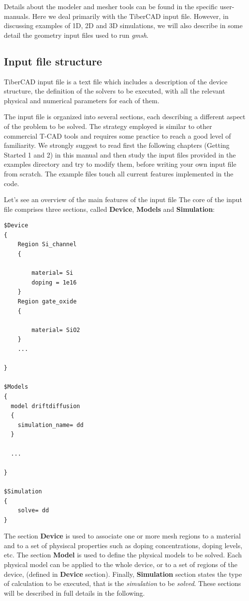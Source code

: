 Details about the modeler and mesher tools can be found in the specific user-manuals. Here we deal primarily with the TiberCAD{}   input file. However, in discussing examples of 1D, 2D and 3D simulations, we will also describe in some detail the geometry input files used to run {\em gmsh}.  
\subsection{ Input file  structure}
 TiberCAD{}   input file is  a  text file  which  includes  a  description of  the  device  structure,  the  definition of  the  solvers  to  be  executed,  with  all  the  relevant  physical and  numerical  parameters for  each  of  them.


The input file is organized into several sections, each describing a different aspect of the problem to be solved. The strategy employed is similar to other commercial T-CAD tools and requires some practice to reach a good level of familiarity. We strongly suggest to read first the following chapters (Getting  Started  1 and  2)  in this manual and then study the input files provided in the examples directory and try to  modify them, before writing your own  input file from scratch. The example files touch all current features implemented in the code.

Let's see  an  overview  of  the  main  features of the  input file 
The core of  the input file comprises three sections, called \textbf{Device}, \textbf{Models} and \textbf{Simulation}:

\begin{verbatim}
$Device
{
	Region Si_channel
	{
		
		material= Si	
		doping = 1e16
	}
	Region gate_oxide
	{
		
		material= SiO2
	}
	...
	
}

$Models
{
  model driftdiffusion
  {
    simulation_name= dd
  }
  
  ...
  
}

$Simulation
{
	solve= dd
}
\end{verbatim}

The section \textbf{Device} is used to associate one or more mesh regions to a material and to a set of   physiscal properties such as doping concentrations, doping levels, etc.
 The section
\textbf{Model} is used to define the physical models to be solved. Each physical model can be applied to the whole  device, or to a set of regions of  the  device,  (defined in \textbf{Device}   section). 
Finally, \textbf{Simulation}  section states the type of calculation to  be  executed,  that is  the  \textit{simulation} to  be  \textit{solved}.
These  sections  will  be  described  in full details  in  the  following.

